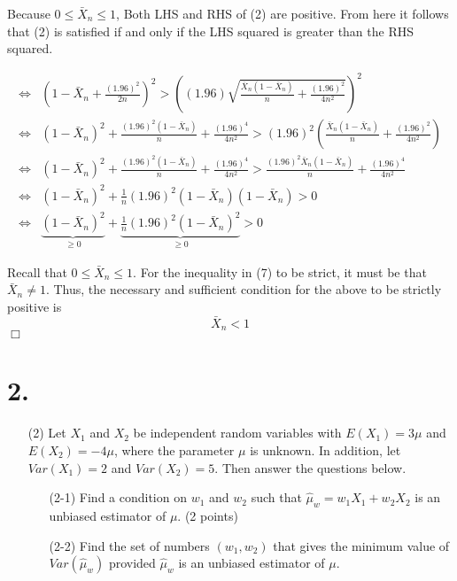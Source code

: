 \documentclass[
]{article}
\begin{document}
\begin{itemize}
Because $0 \le \bar{X}_n \le 1$, Both LHS and RHS of (2) are positive. From here it follows that (2) is satisfied if and only if the LHS squared is greater than the RHS squared.  

\begin{align}
\iff& \left(1- \bar{X}_{n} + \frac{(1.96)^2}{2n}\right)^2 > \left((1.96) \sqrt{\frac{\bar{X}_{n}\left(1-\bar{X}_{n}\right)}{n}+\frac{(1.96)^{2}}{4 n^{2}}}\right)^2 \\
\iff& (1-\bar{X}_n)^2 + \frac{(1.96)^2(1-\bar{X}_n)}{n} + \frac{(1.96)^{4}}{4 n^{2}} > (1.96)^2 \left(\frac{\bar{X}_{n}\left(1-\bar{X}_{n}\right)}{n}+\frac{(1.96)^{2}}{4 n^{2}}\right) \\
\iff& (1-\bar{X}_n)^2 + \frac{(1.96)^2(1-\bar{X}_n)}{n}+ \frac{(1.96)^{4}}{4 n^{2}} > \frac{(1.96)^2\bar{X}_{n}\left(1-\bar{X}_{n}\right)}{n}+\frac{(1.96)^{4}}{4 n^{2}} \\
\iff& (1-\bar{X}_n)^2 + \frac{1}{n}(1.96)^2(1-\bar{X}_n)(1-\bar{X}_n) > 0 \\
\iff& \underbrace{(1-\bar{X}_n)^2}_{\ge0} + \underbrace{\frac{1}{n}(1.96)^2(1-\bar{X}_n)^2}_{\ge0} > 0
\end{align}

Recall that $0 \le \bar{X}_n \le 1$. For the inequality in (7) to be strict, it must be that $\bar{X}_n\ne1$. Thus, the necessary and sufficient condition for the above to be strictly positive is 
 $$\bar{X}_n< 1$$
 \hfill $\Box$
\end{itemize}

\hypertarget{section-1}{%
\section{2.}\label{section-1}}

\begin{itemize}
\item[(2)] Let $X_{1}$ and $X_{2}$ be independent random variables with $E\left(X_{1}\right)=3 \mu$ and $E\left(X_{2}\right)=-4 \mu$, where the parameter $\mu$ is unknown. In addition, let $Var\left(X_{1}\right)=2$ and $Var\left(X_{2}\right)=5$. Then answer the questions below.
\begin{itemize}
\item[(2-1)] Find a condition on $w_{1}$ and $w_{2}$ such that $\widehat{\mu}_{w}=w_{1} X_{1}+w_{2} X_{2}$ is an unbiased estimator of $\mu$. (2 points)
\item[(2-2)] Find the set of numbers $\left(w_{1}, w_{2}\right)$ that gives the minimum value of $Var\left(\widehat{\mu}_{w}\right)$ provided $\widehat{\mu}_{w}$ is an unbiased estimator of $\mu$.
\end{itemize}
\end{itemize}
\end{document}
